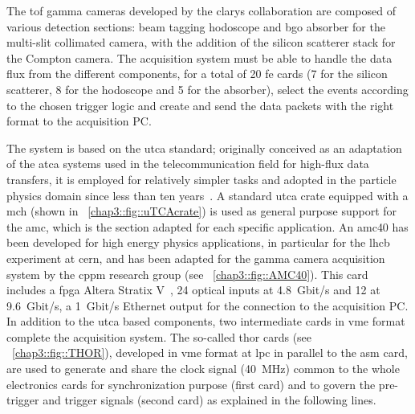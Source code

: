 The \gls{tof} gamma cameras developed by the \gls{clarys} collaboration are composed of various detection sections: beam tagging hodoscope and \gls{bgo} absorber for the multi-slit collimated camera, with the addition of the silicon scatterer stack for the Compton camera. The acquisition system must be able to handle the data flux from the different components, for a total of 20 \gls{fe} cards (7 for the silicon scatterer, 8 for the hodoscope and 5 for the absorber), select the events according to the chosen trigger logic and create and send the data packets with the right format to the acquisition PC.

The system is based on the \gls{utca} standard; originally conceived as an adaptation of the \gls{atca} systems used in the telecommunication field for high-flux data transfers, it is employed for relatively simpler tasks and adopted in the particle physics domain since less than ten years~\parencite{Cachemiche2012, Abellan2013}. A standard \gls{utca} crate equipped with a \gls{mch} (shown in \figurename~\ref{chap3::fig::uTCAcrate}) is used as general purpose support for the \gls{amc}, which is the section adapted for each specific application. An \gls{amc}40 has been developed for high energy physics applications, in particular for the \gls{lhcb} experiment at \gls{cern}, and has been adapted for the gamma camera acquisition system by the \gls{cppm} research group (see \figurename~\ref{chap3::fig::AMC40}). This card includes a \gls{fpga} Altera Stratix V~\parencite{Altera2015}, 24 optical inputs at 4.8~Gbit/s and 12 at 9.6~Gbit/s, a 1~Gbit/s Ethernet output for the connection to the acquisition PC. In addition to the \gls{utca} based components, two intermediate cards in \gls{vme} format complete the acquisition system. The so-called \gls{thor} cards (see \figurename~\ref{chap3::fig::THOR}), developed in \gls{vme} format at \gls{lpc} in parallel to the \gls{asm} card, are used to generate and share the clock signal (40~MHz) common to the whole electronics cards for synchronization purpose (first card) and to govern the pre-trigger and trigger signals (second card) as explained in the following lines.



